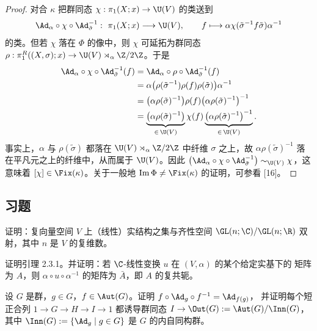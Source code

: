 \begin{proof}
对合 $\kappa$ 把群同态 $\chi:\pi_1(X;x)\to\U(V)$ 的类送到
\[
\Ad_\alpha\circ\chi\circ\Ad_{\tilde\sigma}^{-1}:\ \pi_1(X;x)\longrightarrow\U(V),
\qquad f\longmapsto\alpha\chi(\tilde\sigma^{-1}f\tilde\sigma)\alpha^{-1}
\]
的类。但若 $\chi$ 落在 $\Phi$ 的像中，则 $\chi$ 可延拓为群同态
$\rho:\pi^R_1((X,\sigma);x)\to\U(V)\rtimes_\alpha\Z/2\Z$。于是
\[
\begin{aligned}
\Ad_\alpha\circ\chi\circ\Ad_{\tilde\sigma}^{-1}(f)
&=\Ad_\alpha\circ\rho\circ\Ad_{\tilde\sigma}^{-1}(f)\\
&=\alpha\bigl(\rho(\tilde\sigma^{-1})\rho(f)\rho(\tilde\sigma)\bigr)\alpha^{-1}\\
&=\bigl(\alpha\rho(\tilde\sigma)^{-1}\bigr)\rho(f)
\bigl(\alpha\rho(\tilde\sigma)^{-1}\bigr)^{-1}\\
&=\underbrace{\bigl(\alpha\rho(\tilde\sigma)^{-1}\bigr)}_{\in\,\U(V)}
\chi(f)
\underbrace{\bigl(\alpha\rho(\tilde\sigma)^{-1}\bigr)^{-1}}_{\in\,\U(V)}.
\end{aligned}
\]
事实上，$\alpha$ 与 $\rho(\tilde\sigma)$ 都落在 $\U(V)\rtimes_\alpha\Z/2\Z$ 中纤维
$\sigma$ 之上，故 $\alpha\rho(\tilde\sigma)^{-1}$ 落在平凡元之上的纤维中，从而属于
$\U(V)$。因此 $\bigl(\Ad_\alpha\circ\chi\circ\Ad_{\tilde\sigma}^{-1}\bigr)
\sim_{\U(V)}\chi$，这意味着 $[\chi]\in\Fix(\kappa)$。关于一般地
$\mathrm{Im}\,\Phi\ne\Fix(\kappa)$ 的证明，可参看 [16]。
\end{proof}

\subsection*{习题}

\begin{exercise}\label{ex:2.3.5}
证明：复向量空间 $V$ 上（线性）实结构之集与齐性空间
$\GL(n;\C)/\GL(n;\R)$ 双射，其中 $n$ 是 $V$ 的复维数。
\end{exercise}

\begin{exercise}\label{ex:2.3.6}
证明引理 2.3.1。并证明：若 $\C$-线性变换 $u$ 在 $(V,\alpha)$ 的某个给定实基下的
矩阵为 $A$，则 $\alpha\circ u\circ\alpha^{-1}$ 的矩阵为 $\bar A$，即 $A$ 的复共轭。
\end{exercise}

\begin{exercise}\label{ex:2.3.7}
设 $G$ 是群，$g\in G$，$f\in\Aut(G)$。证明 $f\circ\Ad_g\circ f^{-1}=\Ad_{f(g)}$，
并证明每个短正合列 $1\to G\to H\to I\to1$ 都诱导群同态
$I\to\Out(G):=\Aut(G)/\Inn(G)$，其中
$\Inn(G):=\{\Ad_g\mid g\in G\}$ 是 $G$ 的内自同构群。
\end{exercise}

